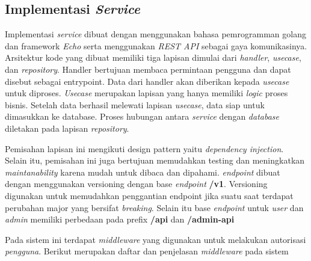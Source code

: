 \subsection{Implementasi \textit{Service}}

Implementasi \textit{service} dibuat dengan menggunakan bahasa pemrogramman golang dan framework \textit{Echo} serta menggunakan \textit{REST API} sebagai gaya komunikasinya. Arsitektur kode yang dibuat memiliki tiga lapisan dimulai dari \textit{handler}, \textit{usecase}, dan \textit{repository}. Handler bertujuan membaca permintaan pengguna dan dapat disebut sebagai entrypoint. Data dari handler akan diberikan kepada \textit{usecase} untuk diproses. \textit{Usecase} merupakan lapisan yang hanya memiliki \textit{logic} proses bisnis. Setelah data berhasil melewati lapisan \textit{usecase}, data siap untuk dimasukkan ke database. Proses hubungan antara \textit{service} dengan \textit{database} diletakan pada lapisan \textit{repository}.

Pemisahan lapisan ini mengikuti design pattern yaitu \textit{dependency injection}. Selain itu, pemisahan ini juga bertujuan memudahkan testing dan meningkatkan \textit{maintanability} karena mudah untuk dibaca dan dipahami. \textit{endpoint} dibuat dengan menggunakan versioning dengan base \textit{endpoint} \textbf{/v1}. Versioning digunakan untuk memudahkan penggantian endpoint jika suatu saat terdapat perubahan major yang bersifat \textit{breaking}. Selain itu base \textit{endpoint} untuk \textit{user} dan \textit{admin} memiliki perbedaan pada prefix \textbf{/api} dan \textbf{/admin-api}

Pada sistem ini terdapat \textit{middleware} yang digunakan untuk melakukan autorisasi \textit{pengguna}. Berikut merupakan daftar dan penjelasan \textit{middleware} pada sistem

